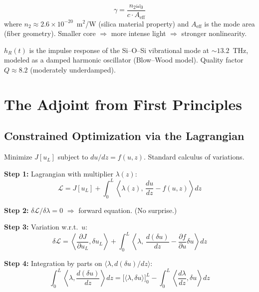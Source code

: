 \documentclass[12pt,a4paper]{article}
\newcommand{\pdv}[2]{\frac{\partial #1}{\partial #2}}
\newcommand{\dv}[2]{\frac{d #1}{d #2}}
\begin{document}
\begin{equation}
\gamma = \frac{n_2\omega_0}{c\cdot A_{\text{eff}}}
\end{equation}
where $n_2 \approx 2.6\times10^{-20}$~m$^2$/W (silica material property) and $A_{\text{eff}}$ is the mode area (fiber geometry). Smaller core $\Rightarrow$ more intense light $\Rightarrow$ stronger nonlinearity.

$h_R(t)$ is the impulse response of the Si--O--Si vibrational mode at ${\sim}13.2$~THz, modeled as a damped harmonic oscillator (Blow--Wood model). Quality factor $Q \approx 8.2$ (moderately underdamped).


\section{The Adjoint from First Principles}
\label{sec:adjoint_first_principles}

\subsection{Constrained Optimization via the Lagrangian}

Minimize $J[u_L]$ subject to $du/dz = f(u,z)$. Standard calculus of variations.

\textbf{Step 1:} Lagrangian with multiplier $\lambda(z)$:
\begin{equation}
\mathcal{L} = J[u_L] + \int_0^L\!\left\langle \lambda(z),\,\dv{u}{z} - f(u,z)\right\rangle dz
\end{equation}

\textbf{Step 2:} $\delta\mathcal{L}/\delta\lambda = 0$ $\Rightarrow$ forward equation. (No surprise.)

\textbf{Step 3:} Variation w.r.t.\ $u$:
\begin{equation}
\delta\mathcal{L} = \left\langle\pdv{J}{u_L},\delta u_L\right\rangle + \int_0^L\!\left\langle\lambda,\,\dv{(\delta u)}{z} - \pdv{f}{u}\delta u\right\rangle dz
\end{equation}

\textbf{Step 4:} Integration by parts on $\langle\lambda, d(\delta u)/dz\rangle$:
\begin{equation}
\int_0^L\!\left\langle\lambda,\dv{(\delta u)}{z}\right\rangle dz = \big[\langle\lambda,\delta u\rangle\big]_0^L - \int_0^L\!\left\langle\dv{\lambda}{z},\delta u\right\rangle dz
\end{equation}
\end{document}
